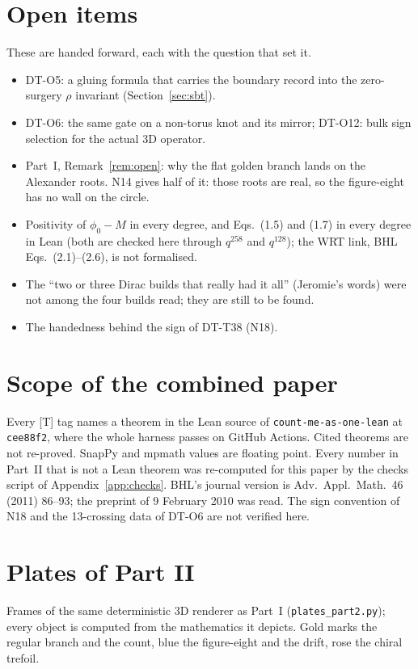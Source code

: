 \documentclass[11pt]{article}
\theoremstyle{definition}
\begin{document}
\section{Open items}\label{sec:open}
These are handed forward, each with the question that set it.
\begin{itemize}[leftmargin=2em]
\item DT-O5: a gluing formula that carries the boundary record into the zero-surgery $\rho$ invariant (Section~\ref{sec:sbt}).
\item DT-O6: the same gate on a non-torus knot and its mirror; DT-O12: bulk sign selection for the actual 3D operator.
\item Part~I, Remark~\ref{rem:open}: why the flat golden branch lands on the Alexander roots. N14 gives half of it: those roots are real, so the figure-eight has no wall on the circle.
\item Positivity of $\phi_0-M$ in every degree, and Eqs.~(1.5) and (1.7) in every degree in Lean (both are checked here through $q^{258}$ and $q^{128}$); the WRT link, BHL Eqs.~(2.1)--(2.6), is not formalised.
\item The ``two or three Dirac builds that really had it all'' (Jeromie's words) were not among the four builds read; they are still to be found.
\item The handedness behind the sign of DT-T38 (N18).
\end{itemize}

\section{Scope of the combined paper}
Every \textsf{[T]} tag names a theorem in the Lean source of \texttt{count-me-as-one-lean} at \texttt{cee88f2}, where the whole harness passes on GitHub Actions. Cited theorems are not re-proved. SnapPy and mpmath values are floating point. Every number in Part~II that is not a Lean theorem was re-computed for this paper by the checks script of Appendix~\ref{app:checks}. BHL's journal version is Adv.\ Appl.\ Math.\ 46 (2011) 86--93; the preprint of 9 February 2010 was read. The sign convention of N18 and the 13-crossing data of DT-O6 are not verified here.

\clearpage
\section*{Plates of Part II}
\noindent Frames of the same deterministic 3D renderer as Part~I (\texttt{plates\_part2.py}); every object is computed from the mathematics it depicts. Gold marks the regular branch and the count, blue the figure-eight and the drift, rose the chiral trefoil.
\end{document}
